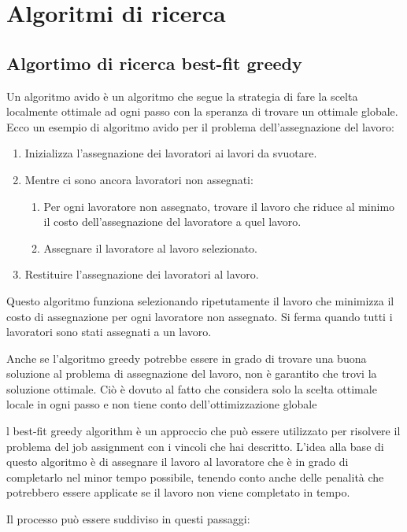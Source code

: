 \chapter{Algoritmi di ricerca} \label{T1}

\section{Algortimo di ricerca best-fit greedy}
Un algoritmo avido è un algoritmo che segue la strategia di fare la scelta localmente ottimale ad ogni passo con la speranza di trovare un ottimale globale. Ecco un esempio di algoritmo avido per il problema dell'assegnazione del lavoro:
\begin{enumerate}
\item Inizializza l'assegnazione dei lavoratori ai lavori da svuotare.
\item Mentre ci sono ancora lavoratori non assegnati:
 \begin{enumerate}
 \item Per ogni lavoratore non assegnato, trovare il lavoro che riduce al minimo il costo dell'assegnazione del lavoratore a quel lavoro.
 \item Assegnare il lavoratore al lavoro selezionato.
\end{enumerate}
\item Restituire l'assegnazione dei lavoratori al lavoro.
\end{enumerate}

Questo algoritmo funziona selezionando ripetutamente il lavoro che minimizza il costo di assegnazione per ogni lavoratore non assegnato. Si ferma quando tutti i lavoratori sono stati assegnati a un lavoro.

Anche se l'algoritmo greedy potrebbe essere in grado di trovare una buona soluzione al problema di assegnazione del lavoro, non è garantito che trovi la soluzione ottimale. Ciò è dovuto al fatto che considera solo la scelta ottimale locale in ogni passo e non tiene conto dell'ottimizzazione globale


l best-fit greedy algorithm è un approccio che può essere utilizzato per risolvere il problema del job assignment con i vincoli che hai descritto. L'idea alla base di questo algoritmo è di assegnare il lavoro al lavoratore che è in grado di completarlo nel minor tempo possibile, tenendo conto anche delle penalità che potrebbero essere applicate se il lavoro non viene completato in tempo.

Il processo può essere suddiviso in questi passaggi:

